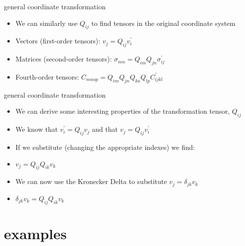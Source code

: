 \documentclass[
  letterpaper,
  ignorenonframetext,
  aspectratio=43,
  handout,
  12pt]{beamer}
\providecommand{\tightlist}{%
  \setlength{\itemsep}{0pt}\setlength{\parskip}{0pt}}
\providecommand{\tightlist}{%
\setlength{\itemsep}{0pt}\setlength{\parskip}{0pt}}
\begin{document}
\begin{frame}{general coordinate transformation}
\protect\hypertarget{general-coordinate-transformation-3}{}
\begin{itemize}
\tightlist
\item
  We can similarly use \(Q_{ij}\) to find tensors in the original
  coordinate system
\item
  Vectors (first-order tensors): \(v_j = Q_{ij} v_i^\prime\)
\item
  Matrices (second-order tensors):
  \(\sigma_{mn} = Q_{im}Q_{jn} \sigma_{ij}^\prime\)
\item
  Fourth-order tensors:
  \(C_{mnop} = Q_{im}Q_{jn}Q_{ko}Q_{lp} C_{ijkl}^\prime\)
\end{itemize}
\end{frame}

\begin{frame}{general coordinate transformation}
\protect\hypertarget{general-coordinate-transformation-4}{}
\begin{itemize}
\tightlist
\item
  We can derive some interesting properties of the transformation
  tensor, \(Q_{ij}\)
\item
  We know that \(v_i^\prime = Q_{ij} v_j\) and that
  \(v_j = Q_{ij} v_i^\prime\)
\item
  If we substitute (changing the appropriate indexes) we find:
\item
  \(v_j = Q_{ij} Q_{ik} v_k\)
\item
  We can now use the Kronecker Delta to substitute
  \(v_j = \delta_{jk}v_k\)
\item
  \(\delta_{jk}v_k = Q_{ij} Q_{ik} v_k\)
\end{itemize}
\end{frame}

\hypertarget{examples}{%
\section{examples}\label{examples}}
\end{document}
